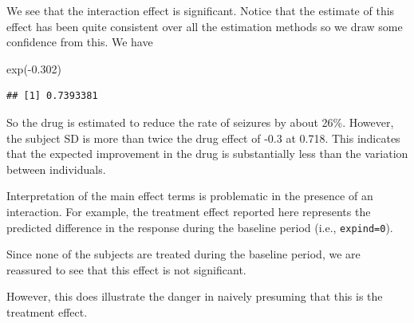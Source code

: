 \documentclass[
  ignorenonframetext,
]{beamer}
\newenvironment{Shaded}{\begin{snugshade}}{\end{snugshade}}
\newcommand{\FloatTok}[1]{\textcolor[rgb]{0.00,0.00,0.81}{#1}}
\newcommand{\FunctionTok}[1]{\textcolor[rgb]{0.00,0.00,0.00}{#1}}
\newcommand{\NormalTok}[1]{#1}
\newcommand{\SpecialCharTok}[1]{\textcolor[rgb]{0.00,0.00,0.00}{#1}}
\begin{document}
\begin{frame}[fragile]{}
\protect\hypertarget{section-11}{}
We see that the interaction effect is significant. Notice that the
estimate of this effect has been quite consistent over all the
estimation methods so we draw some confidence from this. We have

\vspace{12pt}

\begin{Shaded}
\begin{Highlighting}[]
\FunctionTok{exp}\NormalTok{(}\SpecialCharTok{{-}}\FloatTok{0.302}\NormalTok{)}
\end{Highlighting}
\end{Shaded}

\begin{verbatim}
## [1] 0.7393381
\end{verbatim}

\vspace{12pt}

So the drug is estimated to reduce the rate of seizures by about 26\%.
However, the subject SD is more than twice the drug effect of -0.3 at
0.718. This indicates that the expected improvement in the drug is
substantially less than the variation between individuals.
\end{frame}

\begin{frame}{}
\protect\hypertarget{section-12}{}
Interpretation of the main effect terms is problematic in the presence
of an interaction. For example, the treatment effect reported here
represents the predicted difference in the response during the baseline
period (i.e., \texttt{expind=0}).

Since none of the subjects are treated during the baseline period, we
are reassured to see that this effect is not significant.

However, this does illustrate the danger in naively presuming that this
is the treatment effect.
\end{frame}
\end{document}
